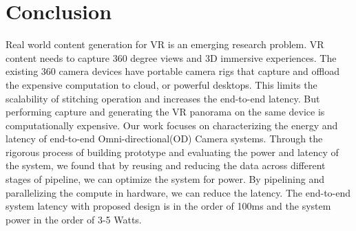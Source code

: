 \chapter{Conclusion}
Real world content generation for VR is an emerging research problem. VR content needs to capture 360 degree views and 3D immersive experiences. The existing 360 camera devices have portable camera rigs that capture and offload the expensive computation to cloud, or powerful desktops. This limits the scalability of stitching operation  and increases the end-to-end latency. But performing capture and generating the VR panorama on the same device is computationally expensive. 	Our work focuses on characterizing the energy and latency of end-to-end Omni-directional(OD) Camera  systems. Through the rigorous process of building prototype and evaluating the power and latency of the system, we found that by reusing and reducing the data across different stages of pipeline, we can optimize the system for power. By pipelining and parallelizing the compute in hardware, we can reduce the latency. The end-to-end system latency with proposed design is in the order of 100ms and the system power in the order of 3-5 Watts.


